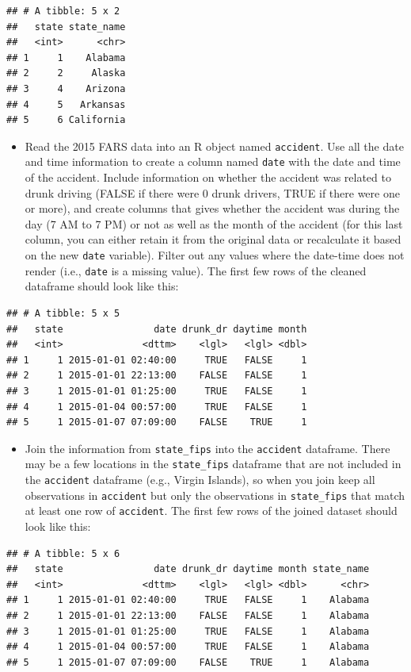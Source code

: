 \documentclass[]{book}
\providecommand{\tightlist}{%
  \setlength{\itemsep}{0pt}\setlength{\parskip}{0pt}}
\theoremstyle{definition}
\theoremstyle{definition}
\theoremstyle{definition}
\theoremstyle{remark}
\begin{document}
\begin{verbatim}
## # A tibble: 5 x 2
##   state state_name
##   <int>      <chr>
## 1     1    Alabama
## 2     2     Alaska
## 3     4    Arizona
## 4     5   Arkansas
## 5     6 California
\end{verbatim}

\begin{itemize}
\tightlist
\item
  Read the 2015 FARS data into an R object named \texttt{accident}. Use
  all the date and time information to create a column named
  \texttt{date} with the date and time of the accident. Include
  information on whether the accident was related to drunk driving
  (FALSE if there were 0 drunk drivers, TRUE if there were one or more),
  and create columns that gives whether the accident was during the day
  (7 AM to 7 PM) or not as well as the month of the accident (for this
  last column, you can either retain it from the original data or
  recalculate it based on the new \texttt{date} variable). Filter out
  any values where the date-time does not render (i.e., \texttt{date} is
  a missing value). The first few rows of the cleaned dataframe should
  look like this:
\end{itemize}

\begin{verbatim}
## # A tibble: 5 x 5
##   state                date drunk_dr daytime month
##   <int>              <dttm>    <lgl>   <lgl> <dbl>
## 1     1 2015-01-01 02:40:00     TRUE   FALSE     1
## 2     1 2015-01-01 22:13:00    FALSE   FALSE     1
## 3     1 2015-01-01 01:25:00     TRUE   FALSE     1
## 4     1 2015-01-04 00:57:00     TRUE   FALSE     1
## 5     1 2015-01-07 07:09:00    FALSE    TRUE     1
\end{verbatim}

\begin{itemize}
\tightlist
\item
  Join the information from \texttt{state\_fips} into the
  \texttt{accident} dataframe. There may be a few locations in the
  \texttt{state\_fips} dataframe that are not included in the
  \texttt{accident} dataframe (e.g., Virgin Islands), so when you join
  keep all observations in \texttt{accident} but only the observations
  in \texttt{state\_fips} that match at least one row of
  \texttt{accident}. The first few rows of the joined dataset should
  look like this:
\end{itemize}

\begin{verbatim}
## # A tibble: 5 x 6
##   state                date drunk_dr daytime month state_name
##   <int>              <dttm>    <lgl>   <lgl> <dbl>      <chr>
## 1     1 2015-01-01 02:40:00     TRUE   FALSE     1    Alabama
## 2     1 2015-01-01 22:13:00    FALSE   FALSE     1    Alabama
## 3     1 2015-01-01 01:25:00     TRUE   FALSE     1    Alabama
## 4     1 2015-01-04 00:57:00     TRUE   FALSE     1    Alabama
## 5     1 2015-01-07 07:09:00    FALSE    TRUE     1    Alabama
\end{verbatim}
\end{document}
